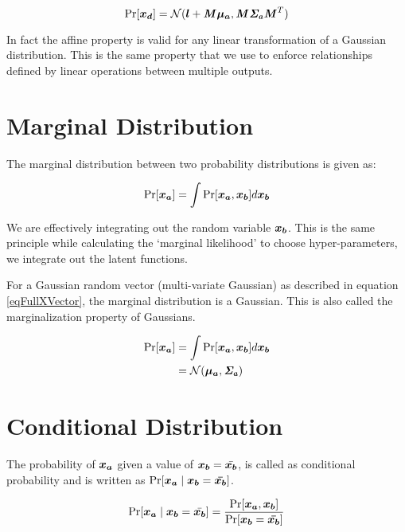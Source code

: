 \begin{equation}
    \Pr[\boldsymbol{x_d}] = \mathcal{N}(\boldsymbol{l} + \bm{\mathit{M}}\boldsymbol{\mu_a}, \bm{\mathit{M}}\bm{\mathit{\Sigma_a}}\bm{\mathit{M}}^T)
\end{equation}

In fact the affine property is valid for any linear transformation of a Gaussian distribution. This is the same property that we use to enforce relationships defined by linear operations between multiple outputs. 
\section{Marginal Distribution}\label{appMarginalDistribution}
The marginal distribution between two probability distributions is given as:

\begin{equation}
   \Pr  [ \boldsymbol{x_a}  ] = \int \Pr  [ \boldsymbol{x_a}, \boldsymbol{x_b}  ] d\boldsymbol{x_b}  
\end{equation}

We are effectively integrating out the random variable $\boldsymbol{x_b}$. This is the same principle while calculating the `marginal likelihood' to choose hyper-parameters, we integrate out the latent functions. 

For a Gaussian random vector (multi-variate Gaussian) as described in equation \ref{eqFullXVector}, the marginal distribution is a Gaussian. This is also called the marginalization property of Gaussians. 

\begin{align}
   \Pr  [ \boldsymbol{x_a}  ] & = \int \Pr  [ \boldsymbol{x_a}, \boldsymbol{x_b}  ] d\boldsymbol{x_b} \\
                     & = \mathcal{N}(\boldsymbol{\mu_a}, \bm{\mathit{\Sigma_a}})
\end{align}

\section{Conditional Distribution}\label{secAppConditionalDistribution}
The probability of $\boldsymbol{x_a}$ given a value of $\boldsymbol{x_b} = \bar{\boldsymbol{x_b}}$, is called as conditional probability and is written as $\Pr[\boldsymbol{x_a} \mid \boldsymbol{x_b} = \boldsymbol{\bar{x_b}}]$. 

\begin{equation}
    \Pr[\boldsymbol{x_a} \mid \boldsymbol{x_b} = \bar{\boldsymbol{x_b}}] = \frac{\Pr[\boldsymbol{x_a}, \boldsymbol{x_b}]}{\Pr[\boldsymbol{x_b} = \boldsymbol{\bar{x_b}}]}
\end{equation}

